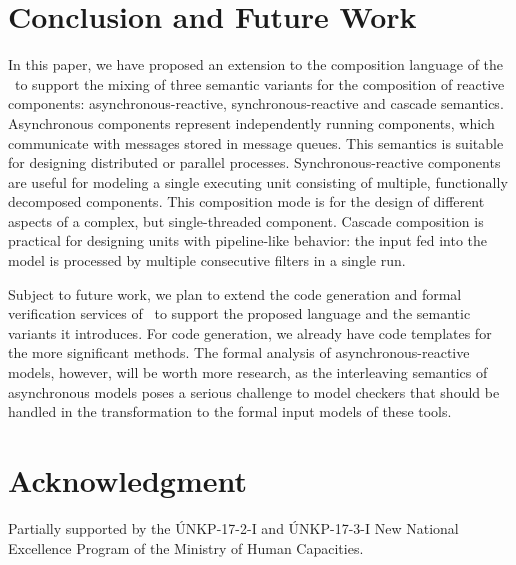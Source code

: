 \section{Conclusion and Future Work}
\label{sec:conclusion}
In this paper, we have proposed an extension to the composition language of the \framework\ to support the mixing of
three semantic variants for the composition of reactive components: asynchronous-reactive, synchronous-reactive and cascade semantics. Asynchronous components represent independently running components, which communicate with messages stored in message queues. This semantics is suitable for designing
distributed or parallel processes. Synchronous-reactive components are useful for modeling a single executing unit consisting of multiple, functionally decomposed components.
This composition mode is for the design of different aspects of a complex, but single-threaded component. Cascade composition is practical for designing units with pipeline-like behavior: the input fed into the model is processed by multiple consecutive filters in a single run.

Subject to future work, we plan to extend the code generation and formal verification services of \gamma\ to support the proposed language and the semantic variants it introduces. For code generation, we already have code templates for the more significant methods. The formal analysis of asynchronous-reactive models, however, will be worth more research, as the interleaving semantics of asynchronous models poses a serious challenge to model checkers that should be handled in the transformation to the formal input models of these tools.

\section*{Acknowledgment}
Partially supported by the \'UNKP-17-2-I and \'UNKP-17-3-I New National Excellence Program of the Ministry of Human Capacities.
